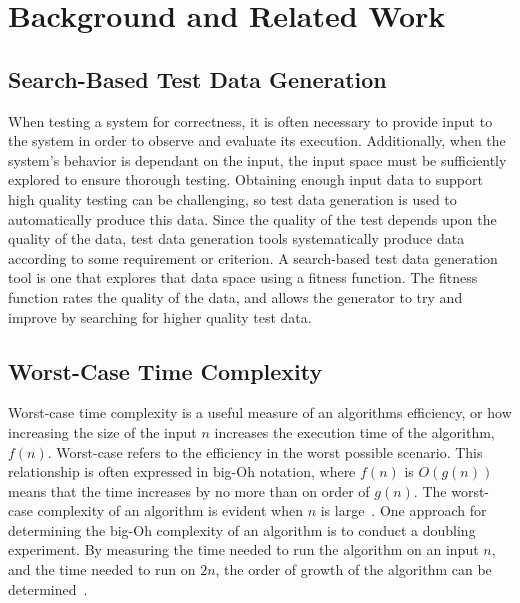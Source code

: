 
\section{Background and Related Work}


\subsection{Search-Based Test Data Generation}

When testing a system for correctness, it is often necessary to provide input to the system in order to observe and
evaluate its execution. Additionally, when the system's behavior is dependant on the input, the input space must be
sufficiently explored to ensure thorough testing.  Obtaining enough input data to support high quality testing can be
challenging, so test data generation is used to automatically produce this data. Since the quality of the test depends
upon the quality of the data, test data generation tools systematically produce data according to some requirement or
criterion. A search-based test data generation tool is one that explores that data space using a fitness function.  The
fitness function rates the quality of the data, and allows the generator to try and improve by searching for higher
quality test data.



\subsection{Worst-Case Time Complexity}

Worst-case time complexity is a useful measure of an algorithms efficiency, or how increasing the size of the input $n$
increases the execution time of the algorithm, $f(n)$.  Worst-case refers to the efficiency in the worst possible
scenario.  This relationship is often expressed in big-Oh notation, where $f(n)$ is $O(g(n))$ means that the time
increases by no more than on order of $g(n)$. The worst-case complexity of an algorithm is evident when $n$ is
large~\cite{Goodrich2014}. One approach for determining the big-Oh complexity of an algorithm is to conduct a doubling
experiment. By measuring the time needed to run the algorithm on an input $n$, and the time needed to run on $2n$, the
order of growth of the algorithm can be determined~\cite{McGeoch2012,Sedgewick1998}.

